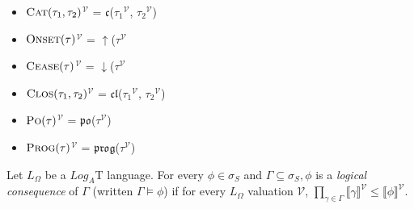 \begin{itemize}
	\item \textlbrackdbl $\textsc{Cat}(\tau_1, \tau_2)$\textrbrackdbl$^{\mathcal{V}}$ = $\mathfrak{c}$(\textlbrackdbl $\tau_1$\textrbrackdbl$^{\mathcal{V}}$, \textlbrackdbl $\tau_2$\textrbrackdbl$^{\mathcal{V}}$)
	\item \textlbrackdbl $\textsc{Onset}(\tau)$\textrbrackdbl$^{\mathcal{V}}$ = $\uparrow$(\textlbrackdbl $\tau$\textrbrackdbl$^{\mathcal{V}}$
	\item \textlbrackdbl $\textsc{Cease}(\tau)$\textrbrackdbl$^{\mathcal{V}}$ = $\downarrow$(\textlbrackdbl $\tau$\textrbrackdbl$^{\mathcal{V}}$
	\item \textlbrackdbl $\textsc{Clos}(\tau_1, \tau_2)$\textrbrackdbl$^{\mathcal{V}}$ = $\mathfrak{cl}$(\textlbrackdbl $\tau_1$\textrbrackdbl$^{\mathcal{V}}$, \textlbrackdbl $\tau_2$\textrbrackdbl$^{\mathcal{V}}$)
	\item \textlbrackdbl $\textsc{Po}(\tau)$\textrbrackdbl$^{\mathcal{V}}$ = $\mathfrak{po}$(\textlbrackdbl $\tau$\textrbrackdbl$^{\mathcal{V}}$)
	\item \textlbrackdbl $\textsc{Prog}(\tau)$\textrbrackdbl$^{\mathcal{V}}$ = $\mathfrak{prog}$(\textlbrackdbl $\tau$\textrbrackdbl$^{\mathcal{V}}$)
\end{itemize}

\begin{defn}
	Let $L_{\Omega}$ be a $Log_A$T language.
	For every $\phi \in \sigma_S$ and $\Gamma \subseteq \sigma_S, \phi$ is a \textit{logical consequence} of $\Gamma$ (written $\Gamma \models \phi$) if for every $L_{\Omega}$ valuation $\mathcal{V}$,
	$\displaystyle \prod_{\gamma \in \Gamma} \llbracket \gamma \rrbracket^{\mathcal{V}} \leq \llbracket \phi \rrbracket^{\mathcal{V}}$.

\end{defn}
